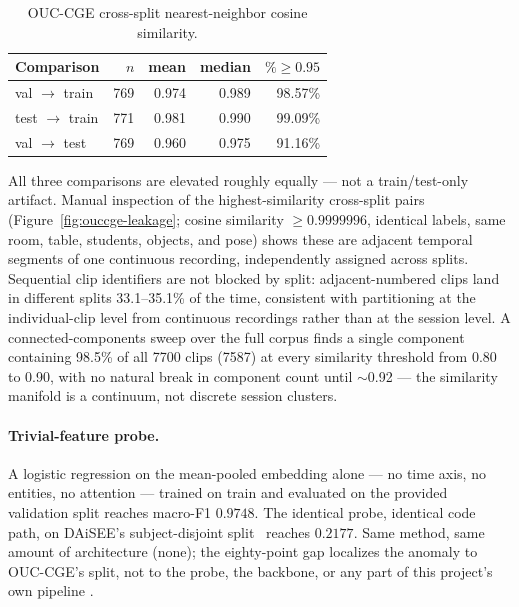 \begin{table}[t]
\caption{OUC-CGE cross-split nearest-neighbor cosine similarity.
}
\label{tab:ouccge-dup}
\begin{tabular}{@{}lrrrr@{}}
\toprule
Comparison & $n$ & mean & median & $\%\!\geq\!0.95$ \\
\midrule
val $\to$ train  & 769 & 0.974 & 0.989 & 98.57\% \\
test $\to$ train & 771 & 0.981 & 0.990 & 99.09\% \\
val $\to$ test   & 769 & 0.960 & 0.975 & 91.16\% \\
\bottomrule
\end{tabular}
\end{table}

All three comparisons are elevated roughly equally --- not a train/test-only
artifact. Manual inspection of the highest-similarity cross-split pairs
(Figure~\ref{fig:ouccge-leakage}; cosine similarity $\geq 0.9999996$,
identical labels, same room, table, students, objects, and pose) shows
these are adjacent temporal segments of one
continuous recording, independently assigned across splits. Sequential clip
identifiers are not blocked by split: adjacent-numbered clips land in
different splits
33.1--35.1\% of the time, consistent with partitioning at the individual-clip
level from continuous recordings rather than at the session level. A
connected-components sweep over the full corpus finds a single component
containing
98.5\% of all 7700 clips (7587) at every similarity threshold from 0.80 to
0.90, with no natural break in component count until $\sim$0.92 --- the
similarity manifold is a continuum, not discrete session clusters.

\paragraph{Trivial-feature probe.}
A logistic regression on the mean-pooled embedding alone --- no time axis,
no entities, no attention --- trained on train and evaluated on the provided
validation split reaches
macro-F1 $0.9748$. The identical probe, identical code path, on DAiSEE's
subject-disjoint split~\cite{gupta2016daisee} reaches
$0.2177$. Same method, same amount of architecture (none); the eighty-point
gap localizes the anomaly to OUC-CGE's split, not to the probe, the backbone,
or any part of this project's own pipeline
.

